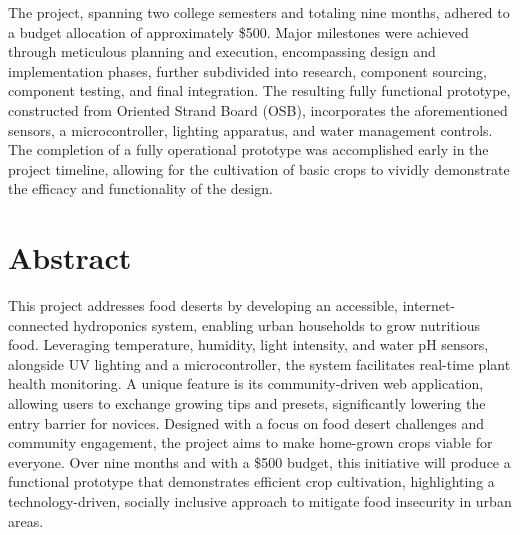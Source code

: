 \documentclass[12pt]{article}
\newcommand{\comment}[1]{} %
\begin{document}
The project, spanning two college semesters and totaling nine months, adhered to a budget allocation of approximately \$500. Major milestones were achieved through meticulous planning and execution, encompassing design and implementation phases, further subdivided into research, component sourcing, component testing, and final integration. The resulting fully functional prototype, constructed from Oriented Strand Board (OSB), incorporates the aforementioned sensors, a microcontroller, lighting apparatus, and water management controls. The completion of a fully operational prototype was accomplished early in the project timeline, allowing for the cultivation of basic crops to vividly demonstrate the efficacy and functionality of the design.

\comment{


\section*{Dedication}
\addcontentsline{toc}{section}{Dedication}
\lipsum[1] %


}

\comment {


\section*{Acknowledgment}
\addcontentsline{toc}{section}{Acknowledgment}
\lipsum[1] %

}

\tableofcontents
\pagebreak

\listoftables
\pagebreak

\listoffigures
\pagebreak

\section*{Abstract}
\noindent This project addresses food deserts by developing an accessible, internet-connected hydroponics system, enabling urban households to grow nutritious food. Leveraging temperature, humidity, light intensity, and water pH sensors, alongside UV lighting and a microcontroller, the system facilitates real-time plant health monitoring. A unique feature is its community-driven web application, allowing users to exchange growing tips and presets, significantly lowering the entry barrier for novices. Designed with a focus on food desert challenges and community engagement, the project aims to make home-grown crops viable for everyone. Over nine months and with a \$500 budget, this initiative will produce a functional prototype that demonstrates efficient crop cultivation, highlighting a technology-driven, socially inclusive approach to mitigate food insecurity in urban areas.
\end{document}
